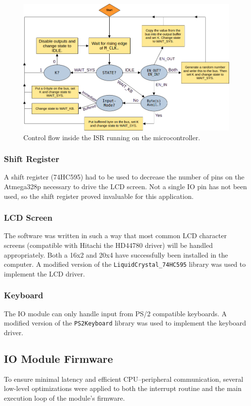 \begin{figure}[H]
  \centering
  \includegraphics[width=\textwidth]{img/isrflow}
  \caption{Control flow inside the ISR running on the microcontroller.}
  \label{fig:isrflow}
\end{figure}

\subsubsection{Shift Register}
A shift register (74HC595) had to be used to decrease the number of pins on the Atmega328p necessary to drive the LCD screen. Not a single IO pin has not been used, so the shift register proved invaluable for this application.

\subsubsection{LCD Screen}
The software was written in such a way that most common LCD character screens (compatible with Hitachi the HD44780 driver) will be handled appropriately. Both a 16x2 and 20x4 have successfully been installed in the computer. A modified version of the \texttt{LiquidCrystal\_74HC595} library was used to implement the LCD driver.

\subsubsection{Keyboard}
The IO module can only handle input from PS/2 compatible keyboards. A modified version of the \texttt{PS2Keyboard} library was used to implement the keyboard driver.




\newpage\subsection{IO Module Firmware}
To ensure minimal latency and efficient CPU--peripheral communication, several low-level optimizations were applied to both the interrupt routine and the main execution loop of the module's firmware. 

